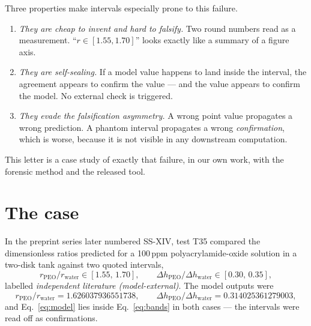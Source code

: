 \documentclass[11pt,a4paper]{article}
\begin{document}
Three properties make intervals especially prone to this failure.
\begin{enumerate}
    \item \emph{They are cheap to invent and hard to falsify.} Two round
    numbers read as a measurement. ``$r \in [1.55,1.70]$'' looks exactly
    like a summary of a figure axis.
    \item \emph{They are self-sealing.} If a model value happens to land
    inside the interval, the agreement appears to confirm the value --- and
    the value appears to confirm the model. No external check is triggered.
    \item \emph{They evade the falsification asymmetry.} A wrong point value
    propagates a wrong prediction. A phantom interval propagates a wrong
    \emph{confirmation}, which is worse, because it is not visible in any
    downstream computation.
\end{enumerate}
This letter is a case study of exactly that failure, in our own work, with
the forensic method and the released tool.

\section{The case}
In the preprint series later numbered SS-XIV, test T35 compared the
dimensionless ratios predicted for a 100\,ppm polyacrylamide-oxide solution in
a two-disk tank against two quoted intervals,
\begin{equation}
\label{eq:bands}
r_{\mathrm{PEO}}/r_{\mathrm{water}} \in [1.55,\,1.70],
\qquad
\Delta h_{\mathrm{PEO}}/\Delta h_{\mathrm{water}} \in [0.30,\,0.35],
\end{equation}
labelled \emph{independent literature (model-external)}. The model outputs
were
\begin{equation}
\label{eq:model}
r_{\mathrm{PEO}}/r_{\mathrm{water}} = 1.626037936551738,
\qquad
\Delta h_{\mathrm{PEO}}/\Delta h_{\mathrm{water}} = 0.314025361279003,
\end{equation}
and Eq.~\eqref{eq:model} lies inside Eq.~\eqref{eq:bands} in both cases ---
the intervals were read off as confirmations.
\end{document}
